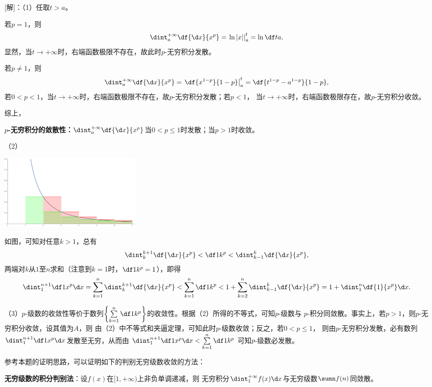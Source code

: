 [解]：（1）任取$t>a$。

若$p=1$，则
$$\dint_a^{+\infty}\df{\d x}{x^p}=\left.\ln|x|\right|_a^t=\ln\df ta,$$
显然，当$t\to+\infty$时，右端函数极限不存在，故此时$p$-无穷积分发散。

若$p\ne 1$，则
$$\dint_a^{+\infty}\df{\d x}{x^p}=\left.\df{x^{1-p}}{1-p}\right|_a^t
=\df{t^{1-p}-a^{1-p}}{1-p},$$
若$0<p<1$，当$t\to+\infty$时，右端函数极限不存在，故$p$-无穷积分发散；若$p<1$，
当$t\to+\infty$时，右端函数极限存在，故$p$-无穷积分收敛。

综上，
\begin{thx}
	{\bf $p$-无穷积分的敛散性：}$\dint_a^{+\infty}\df{\d x}{x^p}$当$0<p\leq 1$时发散；当$p>1$时收敛。	
\end{thx}

（2）
\begin{center}
	\includegraphics[width=7cm]{./images/ch5/xpVsSum.pdf}
\end{center}

如图，可知对任意$k>1$，总有
$$\dint_k^{k+1}\df{\d x}{x^p}<\df1{k^p}<\dint_{k-1}^k\df{\d x}{x^p},$$
两端对$k$从$1$至$n$求和（注意到$k=1$时，$\df1{k^p}=1$），即得
$$\dint_1^{n+1}\df 1{x^p}\d x=
\sum\limits_{k=1}^n\dint_k^{k+1}\df{\d x}{x^p}
<\sum\limits_{k=1}^n\df1{k^p}<
1+\sum\limits_{k=2}^n\dint_{k-1}^k\df{\d x}{x^p}
=1+\dint_1^n\df{1}{x^p}\d x.$$

（3）$p$-级数的收敛性等价于数列$\left\{\sum\limits_{k=1}^n
\df1{k^p}\right\}$的收敛性。根据（2）所得的不等式，可知$p$-级数与
$p$-积分同敛散。事实上，若$p>1$，则$p$-无穷积分收敛，设其值为$A$，则
由（2）中不等式和夹逼定理，可知此时$p$-级数收敛；反之，若$0<p\leq1$，
则由$p$-无穷积分发散，必有数列$\dint_1^{n+1}\df 1{x^p}\d x$发散至无穷，从而由
$\dint_1^{n+1}\df 1{x^p}\d x<\sum\limits_{k=1}^n\df1{k^p}$
可知$p$-级数必发散。\fin

参考本题的证明思路，可以证明如下的判别无穷级数收敛的方法：

\begin{thx}
	{\bf 无穷级数的积分判别法}：设$f(x)$在$[1,+\infty)$上非负单调递减，则
	无穷积分$\dint_1^{+\infty}f(x)\d x$与无穷级数$\sumn f(n)$同敛散。
\end{thx}

